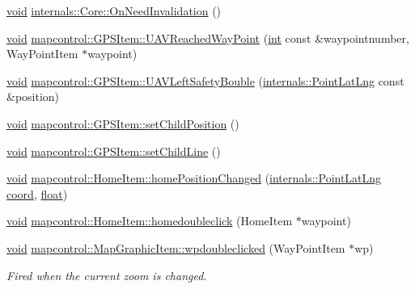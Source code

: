 \begin{DoxyCompactItemize}
\item 
\hyperlink{group___u_a_v_objects_plugin_ga444cf2ff3f0ecbe028adce838d373f5c}{void} \hyperlink{group___o_p_map_widget_gaa550210d61bf033b3dd3d73fbfd7d8f9}{internals\-::\-Core\-::\-On\-Need\-Invalidation} ()
\item 
\hyperlink{group___u_a_v_objects_plugin_ga444cf2ff3f0ecbe028adce838d373f5c}{void} \hyperlink{group___o_p_map_widget_ga1631e3c57b806164009c3cf0b06bc32e}{mapcontrol\-::\-G\-P\-S\-Item\-::\-U\-A\-V\-Reached\-Way\-Point} (\hyperlink{ioapi_8h_a787fa3cf048117ba7123753c1e74fcd6}{int} const \&waypointnumber, Way\-Point\-Item $\ast$waypoint)
\item 
\hyperlink{group___u_a_v_objects_plugin_ga444cf2ff3f0ecbe028adce838d373f5c}{void} \hyperlink{group___o_p_map_widget_ga1ff02a44dc75d4a1e4b596c525cdd01c}{mapcontrol\-::\-G\-P\-S\-Item\-::\-U\-A\-V\-Left\-Safety\-Bouble} (\hyperlink{structinternals_1_1_point_lat_lng}{internals\-::\-Point\-Lat\-Lng} const \&position)
\item 
\hyperlink{group___u_a_v_objects_plugin_ga444cf2ff3f0ecbe028adce838d373f5c}{void} \hyperlink{group___o_p_map_widget_ga049682502601e7325ec7d23d8a01bf5c}{mapcontrol\-::\-G\-P\-S\-Item\-::set\-Child\-Position} ()
\item 
\hyperlink{group___u_a_v_objects_plugin_ga444cf2ff3f0ecbe028adce838d373f5c}{void} \hyperlink{group___o_p_map_widget_gab1b84f9c892548a9994f0e69cc0be466}{mapcontrol\-::\-G\-P\-S\-Item\-::set\-Child\-Line} ()
\item 
\hyperlink{group___u_a_v_objects_plugin_ga444cf2ff3f0ecbe028adce838d373f5c}{void} \hyperlink{group___o_p_map_widget_ga0e1509f9592dd23581de347130ed8d85}{mapcontrol\-::\-Home\-Item\-::home\-Position\-Changed} (\hyperlink{structinternals_1_1_point_lat_lng}{internals\-::\-Point\-Lat\-Lng} \hyperlink{glext_8h_a4ad6f000813afde2b5727cbfdddc75be}{coord}, \hyperlink{_super_l_u_support_8h_a6a1bb6ed41f44b60e7bd83b0e9945aa7}{float})
\item 
\hyperlink{group___u_a_v_objects_plugin_ga444cf2ff3f0ecbe028adce838d373f5c}{void} \hyperlink{group___o_p_map_widget_ga7d84c3892299fbfa670e98cca3cb871d}{mapcontrol\-::\-Home\-Item\-::homedoubleclick} (Home\-Item $\ast$waypoint)
\item 
\hyperlink{group___u_a_v_objects_plugin_ga444cf2ff3f0ecbe028adce838d373f5c}{void} \hyperlink{group___o_p_map_widget_ga795f053b52b5fe955eee059db5cb0afd}{mapcontrol\-::\-Map\-Graphic\-Item\-::wpdoubleclicked} (Way\-Point\-Item $\ast$wp)
\begin{DoxyCompactList}\small\item\em Fired when the current zoom is changed. \end{DoxyCompactList}\item 

\end{DoxyCompactItemize}
